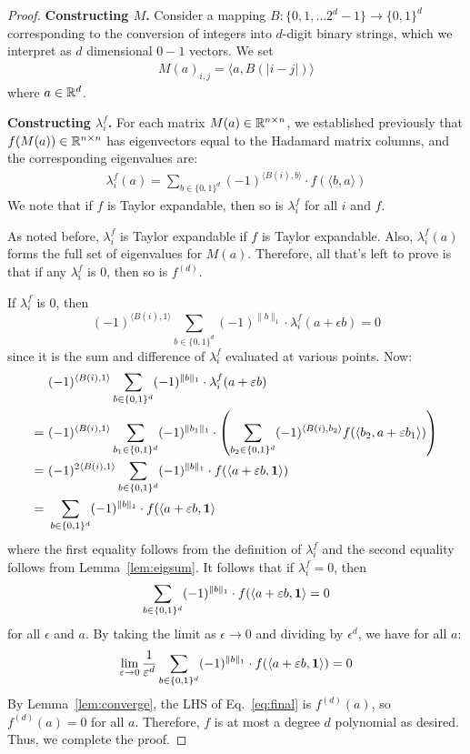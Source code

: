 \begin{proof} 

{\bf Constructing $M$.}
Consider a mapping $B : \{0, 1, \ldots 2^{d}-1\} \rightarrow \{0,1\}^d$ corresponding to the conversion of integers into $d$-digit binary strings, which we interpret as $d$ dimensional $0-1$ vectors. We set
\begin{align*}
M(a)_{i,j} = \langle a, B(|i-j|) \rangle
\end{align*}
where $a \in \R^d$. 

{\bf Constructing $\lambda^f_i$.}
For each matrix $M(a) \in \R^{n \times n}$, we established previously that $f(M(a)) \in \R^{n \times n}$ has eigenvectors equal to the Hadamard matrix columns, and the corresponding eigenvalues are:  
\begin{align*}%
\lambda^f_i(a) = \sum_{b \in \{0,1\}^d} (-1)^{\langle B(i), b \rangle} \cdot f(\langle b, a \rangle) 
\end{align*}
We note that if $f$ is Taylor expandable, then so is $\lambda_i^f$ for all $i$ and $f$.

 
As noted before, $\lambda^f_i$ is Taylor expandable if $f$ is Taylor expandable. Also, $\lambda^f_i(a)$ forms the full set of eigenvalues for $M(a)$. Therefore, all that's left to prove is that if any $\lambda^f_i$ is $0$, then so is $f^{(d)}$.

If $\lambda^f_i$ is $0$, then 
\[
 (-1)^{\langle B(i), 1 \rangle} \sum_{b \in \{0,1\}^d} (-1)^{\|b\|_1} \cdot \lambda^f_i(  a+\epsilon b  ) = 0
\]
since it is the sum and difference of $\lambda^f_i$ evaluated at various points. Now:
\begin{align*}
& ~ (-1)^{\langle B(i), 1 \rangle} \sum_{b \in \{0,1\}^d} (-1)^{\|b\|_1} \cdot \lambda^f_i(  a+\epsilon b  ) \\
= & ~ 
(-1)^{\langle B(i), 1 \rangle} \sum_{b_1 \in \{0,1\}^d} (-1)^{\|b_1\|_1} \cdot \left(\sum_{b_2 \in \{0, 1\}^d} (-1)^{\langle B(i), b_2 \rangle} f(\langle b_2, a + \epsilon b_1 \rangle) \right)\\
= & ~ (-1)^{2 \langle B(i), 1 \rangle} \sum_{b \in \{0, 1\}^d} (-1)^{\|b\|_1} \cdot f ( \langle a + \epsilon b, {\bf 1} \rangle)\\
= & ~ \sum_{b \in \{0, 1\}^d} (-1)^{\|b\|_1} \cdot f ( \langle a + \epsilon b, {\bf 1} \rangle
\end{align*}
where the first equality follows from the definition of $\lambda_i^f$ and the second equality follows from Lemma~\ref{lem:eigsum}. It follows that if $\lambda_i^f = 0$, then
\[
\sum_{b \in \{0, 1\}^d} (-1)^{\|b\|_1} \cdot f ( \langle a + \epsilon b, {\bf 1} \rangle = 0
\] 
for all $\epsilon$ and $a$. By taking the limit as $\epsilon \to 0$ and dividing by $\epsilon^d$, we have for all $a$:
\begin{align}\label{eq:final}
\lim_{\epsilon \rightarrow 0} \frac{1}{ \epsilon^d}\sum_{b \in \{0, 1\}^d} (-1)^{\|b\|_1} \cdot f ( \langle a + \epsilon b, {\bf 1} \rangle) = 0
\end{align}
By Lemma~\ref{lem:converge}, the LHS of Eq.~\eqref{eq:final} is $f^{(d)}(a)$, so $f^{(d)}(a) = 0$ for all $a$. Therefore, $f$ is at most a degree $d$ polynomial as desired. Thus, we complete the proof.
\end{proof}


